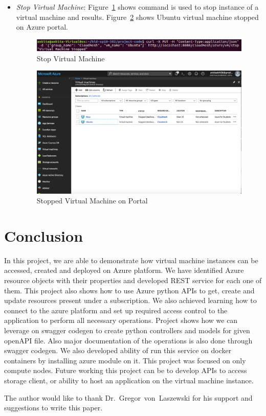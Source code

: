 \begin{itemize}
\item \textit{Stop Virtual Machine}: Figure~\ref{fig:vm-stop} shows command
is used to stop instance of a virtual machine and results.
Figure~\ref{fig:azure-vm-stopped} shows Ubuntu virtual machine stopped on Azure
portal.

\begin{figure}[!ht]
        \centering\includegraphics[width=\columnwidth]
        {image/vm-stop.PNG}
        \caption{Stop Virtual Machine}\label{fig:vm-stop}
\end{figure}

\begin{figure}[!ht]
        \centering\includegraphics[width=\columnwidth]
        {image/azure-vm-stopped.PNG}
        \caption{Stopped Virtual Machine on Portal}\label{fig:azure-vm-stopped}
\end{figure}

\end{itemize}

\section{Conclusion}
In this project, we are able to demonstrate how virtual machine instances can
be accessed, created and deployed on Azure platform. We have identified Azure
resource objects with their properties and developed REST service for each one
of them. This project also shows how to use Azure python APIs to get, create
and update resources present under a subscription. We also achieved learning
how to connect to the azure platform and set up required access control to the
application to perform all necessary operations. Project shows how we can
leverage on swagger codegen to create python controllers and models for given
openAPI file. Also major documentation of the operations is also done through
swagger codegen. We also developed ability of run this service on docker
containers by installing azure module on it. This project was focused on only
compute nodes. Future working this project can be to develop APIs to access
storage client, or ability to host an application on the virtual machine
instance.


\begin{acks}

  The author would like to thank Dr.~Gregor~von~Laszewski for his
  support and suggestions to write this paper.

\end{acks}



 

